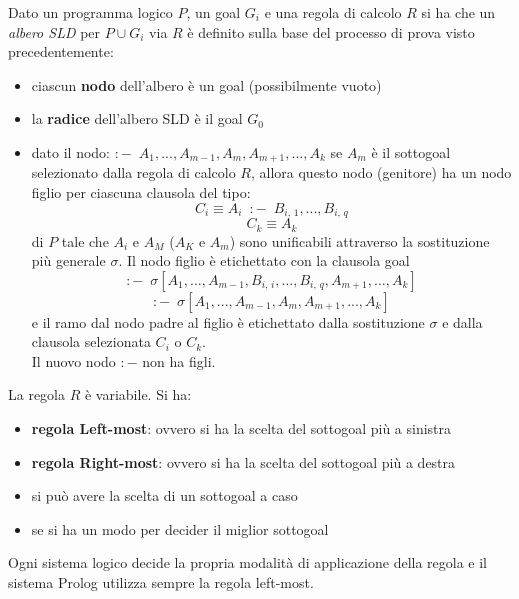 \documentclass[a4paper]{report}
\begin{document}
Dato un programma logico $P$, un goal $G_i$ e una regola di calcolo $R$ si ha che un \textit{albero SLD} per $P\cup G_i$ via $R$
è definito sulla base del processo di prova visto precedentemente:
\begin{itemize}
\item ciascun \textbf{nodo} dell'albero è un goal (possibilmente vuoto)
\item la \textbf{radice }dell'albero SLD è il goal $G_0$
\item dato il nodo: $:-\,\,\, A_1,...,A_{m-1},A_m,A_{m+1},...,A_k$
  se $A_m$ è il sottogoal selezionato dalla regola di calcolo $R$, allora questo nodo (genitore) ha un nodo figlio
  per ciascuna clausola del tipo:
$$C_i\equiv A_i\,\,\, :-\,\,\, B_{i,\,1},...,B_{i,\,q}$$
$$C_k\equiv A_k$$
di $P$ tale che $A_i$ e $A_M$ ($A_K$ e $A_m$) sono unificabili attraverso la sostituzione più generale $\sigma$.\newline
Il nodo figlio è etichettato con la clausola goal
$$:-\,\,\,\sigma[A_1,...,A_{m-1},B_{i,\,i},...,B_{i,\,q},A_{m+1},...,A_k]$$
$$:-\,\,\,\sigma[A_1,...,A_{m-1},A_m,A_{m+1},...,A_k]$$
e il ramo dal nodo padre al figlio è etichettato dalla sostituzione $\sigma$ e dalla clausola selezionata $C_i$ o $C_k$.\\
Il nuovo nodo $:-$ non ha figli.
\end{itemize}
La regola $R$ è variabile. Si ha:
\begin{itemize}
\item \textbf{regola Left-most}: ovvero si ha la scelta del sottogoal più a sinistra 
\item \textbf{regola Right-most}: ovvero si ha la scelta del sottogoal più a destra
\item si può avere la scelta di un sottogoal a caso
\item se si ha un modo per decider il miglior sottogoal  
\end{itemize}
Ogni sistema logico decide la propria modalità di applicazione della regola e il sistema Prolog utilizza sempre la regola left-most.
\end{document}
